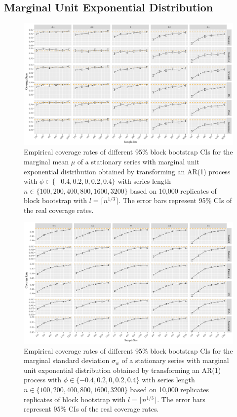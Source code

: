 \documentclass[10pt]{article}
\newcommand{\eds}[1]{\textcolor{red}{EDS: (#1)}}
\newcommand{\mc}[1]{\textcolor{orange}{MC: (#1)}}
\begin{document}
\subsection*{Marginal Unit Exponential Distribution}

\begin{figure}[tbp]
  \centering
  \includegraphics[width=\textwidth]{figures/plot_exp_mu_1}
  \caption{Empirical coverage rates of different 95\% block bootstrap CIs for
    the marginal mean $\mu$ of a stationary series with marginal unit exponential
    distribution obtained by transforming an AR(1) process with
    $\phi \in \{-0.4, 0.2, 0, 0.2, 0.4\}$ with series length
    $n \in \{100, 200, 400, 800, 1600, 3200\}$ based on 10,000 replicates of
    block bootstrap with $l = \lceil n^{1/3} \rceil$. 
    The error bars represent 95\% CIs of the real coverage rates.}
  \label{fig:exp_mu1}
\end{figure}


\begin{figure}[tbp]
  \centering
  \includegraphics[width=\textwidth]{figures/plot_exp_sigma_1}
  \caption{Empirical coverage rates of different 95\% block bootstrap CIs for
    the marginal standard deviation $\sigma_w$ %
    of a stationary series with 
    marginal unit exponential distribution obtained by transforming an AR(1) process
    with $\phi \in \{-0.4, 0.2, 0, 0.2, 0.4\}$ with series length 
    $n \in \{100, 200, 400, 800, 1600, 3200\}$ based on 10,000 replicates 
    replicates of
    block bootstrap with $l = \lceil n^{1/3} \rceil$. 
    The error bars represent 95\% CIs of the real coverage rates.}
  \label{fig:exp_sigma1}
\end{figure}
\end{document}
